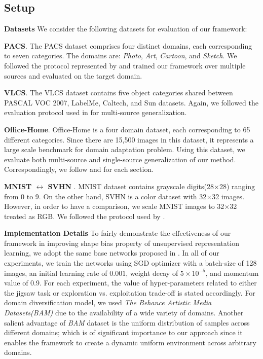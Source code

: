 \documentclass[10pt,twocolumn,letterpaper]{article}
\begin{document}
\subsection{Setup}
\noindent
\textbf{Datasets}\quad 
We consider the following datasets for evaluation of our framework:

\textbf{PACS}. The PACS dataset \cite{li2017deeper} comprises four distinct domains, each corresponding to seven categories. The domains are: \textit{Photo}, \textit{Art}, \textit{Cartoon}, and \textit{Sketch}. We followed the protocol represented by \cite{carlucci2019domain} and trained our framework over multiple sources and evaluated on the target domain.

\textbf{VLCS}. The VLCS dataset \cite{torralba2011unbiased} contains five object categories shared between PASCAL VOC 2007, LabelMe, Caltech, and Sun datasets. Again, we followed the evaluation protocol used in \cite{carlucci2019domain} for multi-source generalization.

\textbf{Office-Home}. Office-Home \cite{venkateswara2017deep} is a four domain dataset, each corresponding to 65 different categories. Since there are 15,500 images in this dataset, it represents a large scale benchmark for domain adaptation problem. Using this dataset, we evaluate both multi-source and single-source generalization of our method. Correspondingly, we follow \cite{carlucci2019domain} and \cite{roy2019unsupervised} for each section. 

\textbf{MNIST $\leftrightarrow$ SVHN }. MNIST dataset \cite{lecun1998gradient} contains grayscale digits(28$\times$28) ranging from 0 to 9. On the other hand, SVHN \cite{netzer2011reading} is a color dataset with 32$\times$32 images.  However, in order to have a comparison, we scale MNIST images to 32$\times$32 treated as RGB. We followed the protocol used by \cite{roy2019unsupervised}.

\vspace{2mm}
\noindent
\textbf{Implementation Details}\quad 
To fairly demonstrate the effectiveness of our framework in improving shape bias property of unsupervised representation learning, we adopt the same base networks proposed in \cite{carlucci2019domain}. In all of our experiments, we train the networks using SGD optimizer with a batch-size of 128 images, an initial learning rate of $0.001$, weight decay of $5 \times 10^{-5}$, and momentum value of 0.9. For each experiment, the value of hyper-parameters related to either the jigsaw task or exploration vs. exploitation trade-off is stated accordingly.
For domain diversification model, we used \textit{The Behance Artistic Media Datasets(BAM)} \cite{Wilber_2017_ICCV} due to the availability of a wide variety of domains. Another salient advantage of \textit{BAM} dataset is the uniform distribution of samples across different domains; which is of significant importance to our approach since it enables the framework to create a dynamic uniform environment across arbitrary domains.
\end{document}
